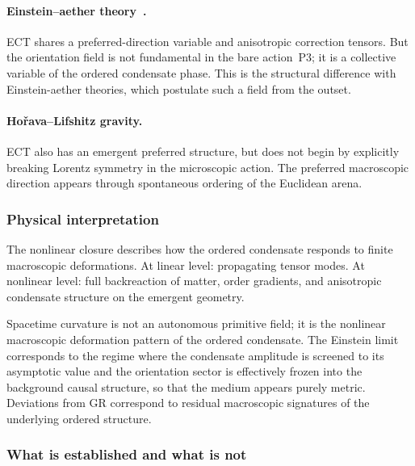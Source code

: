 \documentclass[11pt,a4paper]{article}
\numberwithin{equation}{section}
\begin{document}
\paragraph{Einstein--aether theory~\cite{Jacobson2004}.}
ECT shares a preferred-direction variable and anisotropic correction
tensors.
But the orientation field is not fundamental in the bare action~P3;
it is a collective variable of the ordered condensate phase.
This is the structural difference with Einstein-aether theories, which
postulate such a field from the outset.

\paragraph{Ho\v{r}ava--Lifshitz gravity.}
ECT also has an emergent preferred structure, but does not begin by
explicitly breaking Lorentz symmetry in the microscopic action.
The preferred macroscopic direction appears through spontaneous ordering
of the Euclidean arena.

\subsubsection*{Physical interpretation}

The nonlinear closure describes how the ordered condensate responds to
finite macroscopic deformations.
At linear level: propagating tensor modes.
At nonlinear level: full backreaction of matter, order gradients, and
anisotropic condensate structure on the emergent geometry.

Spacetime curvature is not an autonomous primitive field; it is the
nonlinear macroscopic deformation pattern of the ordered condensate.
The Einstein limit corresponds to the regime where the condensate
amplitude is screened to its asymptotic value and the orientation sector
is effectively frozen into the background causal structure, so that the
medium appears purely metric.
Deviations from GR correspond to residual macroscopic signatures of the
underlying ordered structure.

\subsubsection*{What is established and what is not}
\end{document}
